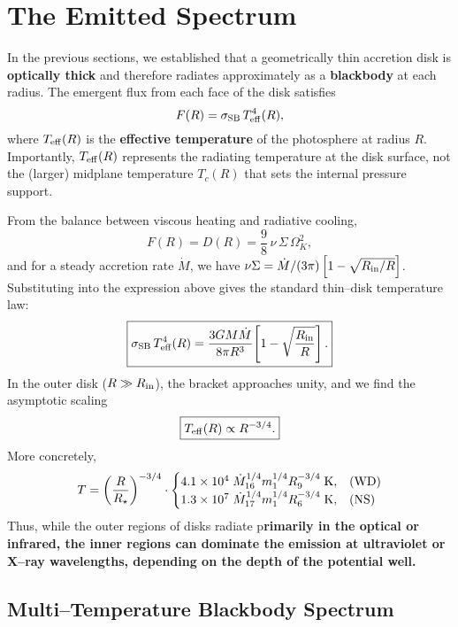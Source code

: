 \section{The Emitted Spectrum}

In the previous sections, we established that a geometrically thin accretion disk is \textbf{optically thick} and therefore radiates approximately as a \textbf{blackbody} at each radius.  The emergent flux from each face of the disk satisfies
\[
F(R) = \sigma_{\rm SB}\,T_{\rm eff}^4(R),
\]
where $T_{\rm eff}(R)$ is the \textbf{effective temperature} of the photosphere at radius $R$.  Importantly, $T_{\rm eff}(R)$ represents the radiating temperature at the disk surface, not the (larger) midplane temperature $T_c(R)$ that sets the internal pressure support.
\par
From the balance between viscous heating and radiative cooling,
\[
F(R) = D(R) = \frac{9}{8}\,\nu\,\Sigma\,\Omega_K^2,
\]
and for a steady accretion rate $\dot{M}$, we have $\nu\Sigma = \dot{M}/(3\pi)\left[1 - \sqrt{R_{\rm in}/R}\right]$. Substituting into the expression above gives the standard thin–disk temperature law:
\begin{equation}
\boxed{
\sigma_{\rm SB}\,T_{\rm eff}^4(R)
= \frac{3GM\dot{M}}{8\pi R^3}
\!\left[1 - \sqrt{\frac{R_{\rm in}}{R}}\right].
}
\label{eq:thin_disk_temperature}
\end{equation}
In the outer disk ($R \gg R_{\rm in}$), the bracket approaches unity, and we find the asymptotic scaling
\begin{equation}
\boxed{
T_{\rm eff}(R) \propto R^{-3/4}.
}
\label{eq:temperature_scaling}
\end{equation}
More concretely, 
\begin{equation}
    T = \left(\frac{R}{R_\star}\right)^{-3/4} \cdot\begin{cases}4.1 \times 10^4\;\dot{M}_{\rm 16}^{1/4} m_1^{1/4} R_9^{-3/4}\;{\rm K},&\text{(WD)}\\
    1.3 \times 10^7\;\dot{M}_{\rm 17}^{1/4} m_1^{1/4} R_6^{-3/4}\;{\rm K},&\text{(NS)}
    \end{cases}
\end{equation}
Thus, while the outer regions of disks radiate p\textbf{rimarily in the optical or infrared, the inner regions can dominate the emission at ultraviolet or X–ray wavelengths, depending on the depth of the potential well.}

\subsection*{Multi–Temperature Blackbody Spectrum}

